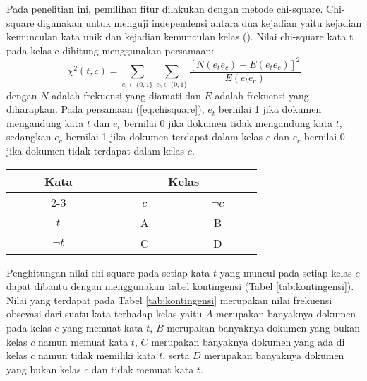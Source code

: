 Pada penelitian ini, pemilihan fitur dilakukan dengan metode chi-square. Chi-square digunakan untuk menguji independensi antara dua kejadian yaitu kejadian kemunculan kata unik dan kejadian kemunculan kelas (\cite{MANNING}). Nilai chi-square kata t pada kelas c dihitung menggunakan persamaan:
\begin{equation}
	\label{eq:chisquare}
	\chi^2(t,c)=\sum_{e_t\in \{0,1\}}\sum_{e_c\in \{0,1\}}
	\frac{ [ N(e_te_c)-E(e_te_c) ]^2}{E(e_te_c)}
\end{equation}
\noindent dengan $N$ adalah frekuensi yang diamati dan $E$ adalah frekuensi yang diharapkan. Pada persamaan (\ref{eq:chisquare}), $e_t$ bernilai 1 jika dokumen mengandung kata $t$ dan $e_t$ bernilai 0 jika dokumen tidak mengandung kata $t$, sedangkan $e_c$ bernilai 1 jika dokumen terdapat dalam kelas $c$ dan $e_c$ bernilai 0 jika dokumen tidak terdapat dalam kelas $c$.
\begin{table*}[h!]
	\begin{center}
		\caption{Tabel kontingensi}
		\label{tab:kontingensi}
		\begin{tabular}{c c c}
			\hline
			\multirow{2}{*}{~~~~~Kata~~~~~}&\multicolumn{2}{c}{~~~~~~~~Kelas~~~~~~~~} \\
			\cline{2-3}
			&~~~$c$~~~&~~~$\neg c$~~~\\
			\hline
			$t$&A&B\\
			$\neg t$&C&D\\
			\hline
		\end{tabular}
	\end{center}
\end{table*}

Penghitungan nilai chi-square pada setiap kata $t$ yang muncul pada setiap kelas $c$ dapat dibantu dengan menggunakan tabel kontingensi (Tabel \ref{tab:kontingensi}). Nilai yang terdapat pada Tabel \ref{tab:kontingensi} merupakan nilai frekuensi obsevasi dari suatu kata terhadap kelas yaitu $A$ merupakan banyaknya dokumen pada kelas $c$ yang memuat kata $t$, $B$ merupakan banyaknya dokumen yang bukan kelas $c$ namun memuat kata $t$, $C$ merupakan banyaknya dokumen yang ada di kelas $c$ namun tidak memiliki kata $t$, serta $D$ merupakan banyaknya dokumen yang bukan kelas $c$ dan tidak memuat kata $t$.

